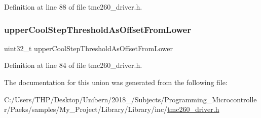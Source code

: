 Definition at line 88 of file tmc260\+\_\+driver.\+h.

\mbox{\label{union_cool_step_control_register___a84ae4a5a201e30da398f39e1a409ee76}} 
\subsubsection{\texorpdfstring{upper\+Cool\+Step\+Threshold\+As\+Offset\+From\+Lower}{upperCoolStepThresholdAsOffsetFromLower}}
{\footnotesize\ttfamily uint32\+\_\+t upper\+Cool\+Step\+Threshold\+As\+Offset\+From\+Lower}



Definition at line 84 of file tmc260\+\_\+driver.\+h.



The documentation for this union was generated from the following file\+:\begin{DoxyCompactItemize}
\item 
C\+:/\+Users/\+T\+H\+P/\+Desktop/\+Unibern/2018\+\_/\+Subjects/\+Programming\+\_\+\+Microcontroller/\+Paeks/samples/\+My\+\_\+\+Project/\+Library/\+Library/inc/\mbox{\hyperlink{tmc260__driver_8h}{tmc260\+\_\+driver.\+h}}\end{DoxyCompactItemize}
